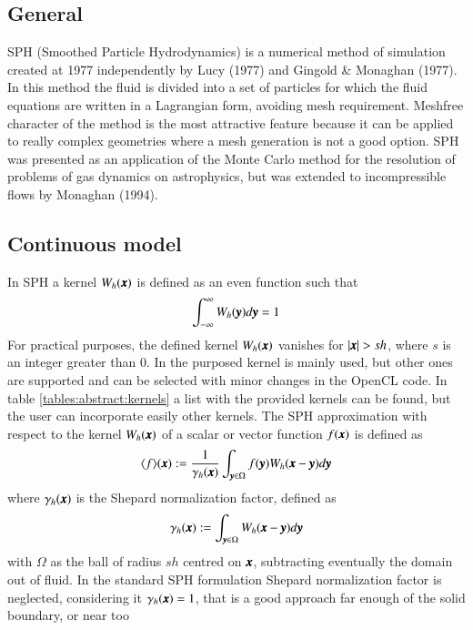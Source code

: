 \subsection{General}
%
SPH (Smoothed Particle Hydrodynamics) is a numerical method of simulation created at 1977
independently by Lucy (1977) and Gingold \& Monaghan (1977). In this method the fluid is
divided into a set of particles for which the fluid equations are written in a Lagrangian
form, avoiding mesh requirement. Meshfree character of the method is the most attractive
feature because it can be applied to really complex geometries where a mesh generation is not
a good option.\rc
%
SPH was presented as an application of the Monte Carlo method for the resolution of problems
of gas dynamics on astrophysics, but was extended to incompressible flows by Monaghan (1994).
%
\subsection{Continuous model}
\label{ss:sph_continuous}
%
In SPH a kernel $W_h(\pmb{x})$ is defined as an even function such that
%
\begin{eqnarray}
\int_{-\infty}^{\infty} W_h(\pmb{y}) d\pmb{y} = 1
\end{eqnarray}
%
For practical purposes, the defined kernel $W_h(\pmb{x})$ vanishes for $\left\vert \pmb{x} \right\vert > sh$,
where $s$ is an integer greater than 0. In \NAME
the \citet{wendland_1995} purposed kernel is mainly used, but other ones are supported and can be selected
with minor changes in the OpenCL code. In table \ref{tables:abstract:kernels} a list with the provided
kernels can be found, but the user can incorporate easily other kernels.\rc
%
The SPH approximation with respect to the kernel $W_h(\pmb{x})$ of a scalar or vector function $f(\pmb{x})$
is defined as
%
\begin{eqnarray}
\langle f \rangle (\pmb{x}) := \frac{1}{\gamma_h(\pmb{x})} \int_{\pmb{y} \in \Omega} f(\pmb{y}) W_h(\pmb{x}-\pmb{y}) d\pmb{y}
\end{eqnarray}
%
where $\gamma_h(\pmb{x})$ is the Shepard normalization factor, defined as
%
\begin{eqnarray}
\gamma_h(\pmb{x}) := \int_{\pmb{y} \in \Omega} W_h(\pmb{x} - \pmb{y}) d\pmb{y}
\end{eqnarray}
%
with $\Omega$ as the ball of radius $sh$ centred on $\pmb{x}$, subtracting eventually the domain out
of fluid. In the standard SPH formulation Shepard normalization factor is neglected, considering
it $\gamma_h(\pmb{x}) = 1$, that is a good approach far enough of the solid boundary, or near too
